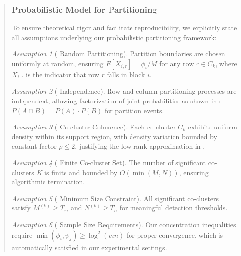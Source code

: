 \documentclass{ar2rc}
\theoremstyle{definition}
\theoremstyle{remark} %
\newtheorem*{assumption*}{Assumption}
\begin{document}
\begin{quote}
  \subsubsection*{ Probabilistic Model for Partitioning}

  To ensure theoretical rigor and facilitate reproducibility, we explicitly state all assumptions underlying our probabilistic partitioning framework:

  \begin{assumption*}[ Random Partitioning]
    Partition boundaries are chosen uniformly at random, ensuring $E[X_{i,r}] = \phi_i/M$ for any row $r \in C_k$, where $X_{i,r}$ is the indicator that row $r$ falls in block $i$.
  \end{assumption*}

  \begin{assumption*}[ Independence]
    Row and column partitioning processes are independent, allowing factorization of joint probabilities as shown in : $P(A \cap B) = P(A) \cdot P(B)$ for partition events.
  \end{assumption*}

  \begin{assumption*}[ Co-cluster Coherence]
    Each co-cluster $C_k$ exhibits uniform density within its support region, with density variation bounded by constant factor $\rho \leq 2$, justifying the low-rank approximation in .
  \end{assumption*}

  \begin{assumption*}[ Finite Co-cluster Set]
    The number of significant co-clusters $K$ is finite and bounded by $O(\min(M,N))$, ensuring algorithmic termination.
  \end{assumption*}

  \begin{assumption*}[ Minimum Size Constraint]
    All significant co-clusters satisfy $M^{(k)} \geq T_m$ and $N^{(k)} \geq T_n$ for meaningful detection thresholds.
  \end{assumption*}

  \begin{assumption*}[ Sample Size Requirements]
    Our concentration inequalities require $\min(\phi_i, \psi_j) \geq \log^2(mn)$ for proper convergence, which is automatically satisfied in our experimental settings.
  \end{assumption*}



\end{quote}
\end{document}
